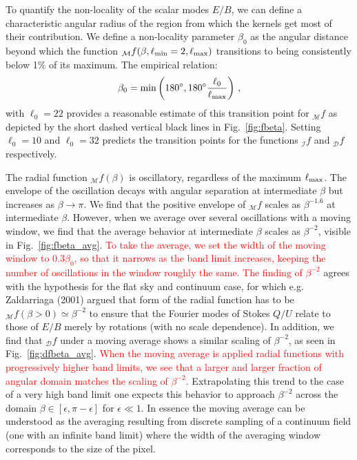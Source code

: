 \documentclass[a4paper,11pt]{article}
\newcommand{\beq}{\begin{equation}}
\newcommand{\eeq}{\end{equation}}
\newcommand{\mm}{\mathcal{M}}
\newcommand{\md}{\mathcal{D}}
\newcommand{\mi}{\mathcal{I}}
\def\fig#1{{Fig.~\ref{#1}}}
\newcommand{\revisit}{\textcolor{red}}
\begin{document}
To quantify the non-locality of the scalar modes $E/B$, we can define a characteristic angular radius of the region from which the kernels get most of their contribution.   We define a non-locality parameter $\beta_{0}$ as the angular distance beyond which the function ${_{\mm}f}(\beta,\ell_{\rm min}=2,\ell_{\rm max})$ transitions to being consistently below 1\% of its maximum.
The empirical relation:
\beq
\beta_0= {\rm min}\left(180^\circ,180^\circ \frac{\ell_{0}}{\ell_{\rm max}} \right) \,,
\eeq
with $\ell_{0}=22$ provides a reasonable estimate of this transition point for ${}_{\mm}f$ as depicted by the short dashed vertical black lines in \fig{fig:fbeta}. Setting $\ell_{0}=10$ and $\ell_{0}=32$ predicts the transition points for the functions ${}_{\mi}f$ and  ${}_{\md}f$ respectively.

The radial function ${}_\mm f(\beta)$ is oscillatory, regardless of the maximum $\ell_{\rm max}$. The envelope of the oscillation decays with angular separation at intermediate $\beta$ but increases as $\beta \rightarrow \pi$.  We find that the positive envelope of ${}_{\mm}f$ scales as $\beta^{-1.6}$ at intermediate $\beta$.  However, when we average over several oscillations with a moving window, we find that the average behavior at intermediate $\beta$ scales as $\beta^{-2}$, visible in \fig{fig:fbeta_avg}. \revisit{To take the average, we set the width of the moving window to $0.3\beta_0$, so that it narrows as the band limit increases, keeping the number of oscillations in the window roughly the same.  The finding of $\beta^{-2}$} agrees with the hypothesis for the {flat sky and continuum case}, for which e.g. Zaldarriaga (2001) \cite{Zaldarriaga2001a} argued that form of the radial function has to be ${}_\mm f(\beta>0)\simeq\beta^{-2}$ to ensure that the Fourier modes of Stokes $Q/U$ relate to those of $E/B$ merely by rotations (with no scale dependence). In addition, we find that ${}_{\md}f$ under a moving average shows a similar scaling of $\beta^{-2}$, as seen in \fig{fig:dfbeta_avg}.
\revisit{When the moving average is applied radial functions with progressively higher band limits, we see that a larger and larger fraction of angular domain matches the scaling of $\beta^{-2}$.}   Extrapolating this trend to the case of a very high band limit one expects this behavior to approach $\beta^{-2}$ across the domain $\beta\in[\epsilon,\pi-\epsilon]$ for $\epsilon \ll 1$. In essence the moving average can be understood as the averaging resulting from discrete sampling of a continuum field (one with an infinite band limit) where the width of the averaging window corresponds to the size of the pixel.
\end{document}
